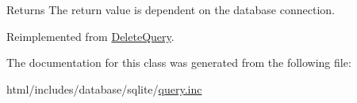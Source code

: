 \begin{DoxyReturn}{Returns}
The return value is dependent on the database connection. 
\end{DoxyReturn}


Reimplemented from \hyperlink{classDeleteQuery_a77b0690ed162255ae8a765fed7db0766}{DeleteQuery}.

The documentation for this class was generated from the following file:\begin{DoxyCompactItemize}
\item 
html/includes/database/sqlite/\hyperlink{sqlite_2query_8inc}{query.inc}\end{DoxyCompactItemize}
